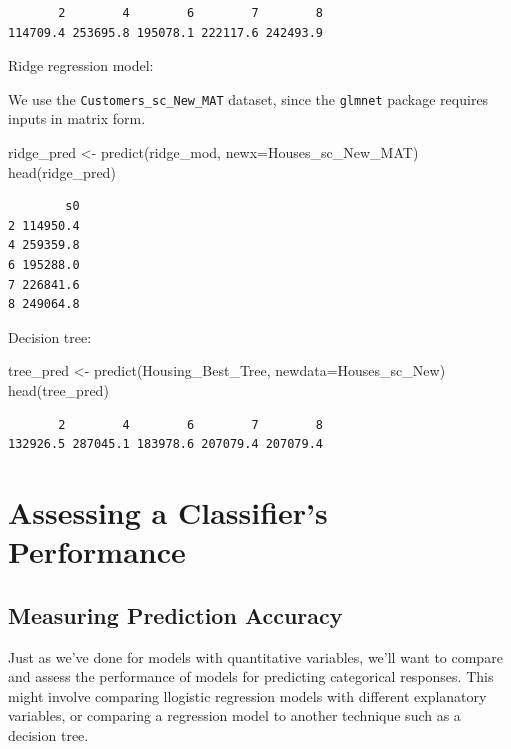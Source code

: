 \documentclass[
  letterpaper,
  DIV=11,
  numbers=noendperiod]{scrreprt}
\newenvironment{Shaded}{\begin{snugshade}}{\end{snugshade}}
\newcommand{\AttributeTok}[1]{\textcolor[rgb]{0.40,0.45,0.13}{#1}}
\newcommand{\FunctionTok}[1]{\textcolor[rgb]{0.28,0.35,0.67}{#1}}
\newcommand{\NormalTok}[1]{\textcolor[rgb]{0.00,0.23,0.31}{#1}}
\newcommand{\OtherTok}[1]{\textcolor[rgb]{0.00,0.23,0.31}{#1}}
\begin{document}
\begin{verbatim}
       2        4        6        7        8 
114709.4 253695.8 195078.1 222117.6 242493.9 
\end{verbatim}

Ridge regression model:

We use the \texttt{Customers\_sc\_New\_MAT} dataset, since the
\texttt{glmnet} package requires inputs in matrix form.

\begin{Shaded}
\begin{Highlighting}[]
\NormalTok{ridge\_pred }\OtherTok{\textless{}{-}} \FunctionTok{predict}\NormalTok{(ridge\_mod, }\AttributeTok{newx=}\NormalTok{Houses\_sc\_New\_MAT)}
\FunctionTok{head}\NormalTok{(ridge\_pred)}
\end{Highlighting}
\end{Shaded}

\begin{verbatim}
        s0
2 114950.4
4 259359.8
6 195288.0
7 226841.6
8 249064.8
\end{verbatim}

Decision tree:

\begin{Shaded}
\begin{Highlighting}[]
\NormalTok{tree\_pred }\OtherTok{\textless{}{-}} \FunctionTok{predict}\NormalTok{(Housing\_Best\_Tree, }\AttributeTok{newdata=}\NormalTok{Houses\_sc\_New)}
\FunctionTok{head}\NormalTok{(tree\_pred)}
\end{Highlighting}
\end{Shaded}

\begin{verbatim}
       2        4        6        7        8 
132926.5 287045.1 183978.6 207079.4 207079.4 
\end{verbatim}

\section{Assessing a Classifier's
Performance}\label{assessing-a-classifiers-performance}

\subsection{Measuring Prediction
Accuracy}\label{measuring-prediction-accuracy}

Just as we've done for models with quantitative variables, we'll want to
compare and assess the performance of models for predicting categorical
responses. This might involve comparing llogistic regression models with
different explanatory variables, or comparing a regression model to
another technique such as a decision tree.
\end{document}
